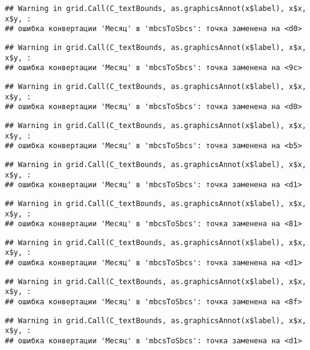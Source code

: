 \documentclass[
]{article}
\begin{document}
\begin{verbatim}
## Warning in grid.Call(C_textBounds, as.graphicsAnnot(x$label), x$x, x$y, :
## ошибка конвертации 'Месяц' в 'mbcsToSbcs': точка заменена на <d0>
\end{verbatim}

\begin{verbatim}
## Warning in grid.Call(C_textBounds, as.graphicsAnnot(x$label), x$x, x$y, :
## ошибка конвертации 'Месяц' в 'mbcsToSbcs': точка заменена на <9c>
\end{verbatim}

\begin{verbatim}
## Warning in grid.Call(C_textBounds, as.graphicsAnnot(x$label), x$x, x$y, :
## ошибка конвертации 'Месяц' в 'mbcsToSbcs': точка заменена на <d0>
\end{verbatim}

\begin{verbatim}
## Warning in grid.Call(C_textBounds, as.graphicsAnnot(x$label), x$x, x$y, :
## ошибка конвертации 'Месяц' в 'mbcsToSbcs': точка заменена на <b5>
\end{verbatim}

\begin{verbatim}
## Warning in grid.Call(C_textBounds, as.graphicsAnnot(x$label), x$x, x$y, :
## ошибка конвертации 'Месяц' в 'mbcsToSbcs': точка заменена на <d1>
\end{verbatim}

\begin{verbatim}
## Warning in grid.Call(C_textBounds, as.graphicsAnnot(x$label), x$x, x$y, :
## ошибка конвертации 'Месяц' в 'mbcsToSbcs': точка заменена на <81>
\end{verbatim}

\begin{verbatim}
## Warning in grid.Call(C_textBounds, as.graphicsAnnot(x$label), x$x, x$y, :
## ошибка конвертации 'Месяц' в 'mbcsToSbcs': точка заменена на <d1>
\end{verbatim}

\begin{verbatim}
## Warning in grid.Call(C_textBounds, as.graphicsAnnot(x$label), x$x, x$y, :
## ошибка конвертации 'Месяц' в 'mbcsToSbcs': точка заменена на <8f>
\end{verbatim}

\begin{verbatim}
## Warning in grid.Call(C_textBounds, as.graphicsAnnot(x$label), x$x, x$y, :
## ошибка конвертации 'Месяц' в 'mbcsToSbcs': точка заменена на <d1>
\end{verbatim}
\end{document}
